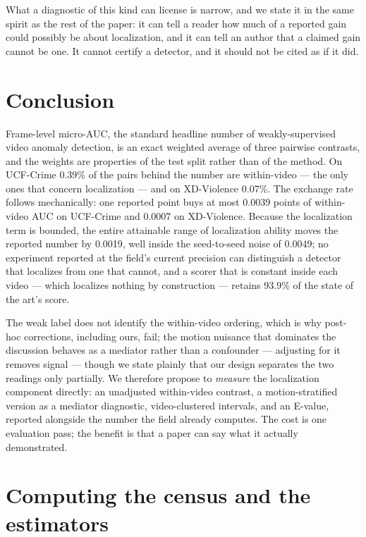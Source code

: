 \documentclass[number,preprint,12pt]{elsarticle}
\begin{document}
What a diagnostic of this kind can license is narrow, and we state it in the same
spirit as the rest of the paper: it can tell a reader how much of a reported gain
could possibly be about localization, and it can tell an author that a claimed
gain cannot be one. It cannot certify a detector, and it should not be cited as
if it did.

\section{Conclusion}\label{sec:conclusion}

Frame-level micro-AUC, the standard headline number of weakly-supervised video
anomaly detection, is an exact weighted average of three pairwise contrasts, and
the weights are properties of the test split rather than of the method. On
UCF-Crime 0.39\% of the pairs behind the number are within-video --- the only ones
that concern localization --- and on XD-Violence 0.07\%. The exchange rate follows
mechanically: one reported point buys at most 0.0039 points of within-video AUC on
UCF-Crime and 0.0007 on XD-Violence. Because the localization term is bounded,
the entire attainable range of localization ability moves the reported number by
0.0019, well inside the seed-to-seed noise of 0.0049; no experiment reported at
the field's current precision can distinguish a detector that localizes from one
that cannot, and a scorer that is constant inside each video --- which localizes
nothing by construction --- retains 93.9\% of the state of the art's score.

The weak label does not identify the within-video ordering, which is why
post-hoc corrections, including ours, fail; the motion nuisance that dominates
the discussion behaves as a mediator rather than a confounder --- adjusting for
it removes signal --- though we state plainly that our design separates the two
readings only partially. We therefore propose to \emph{measure} the localization component
directly: an unadjusted within-video contrast, a motion-stratified version as a
mediator diagnostic, video-clustered intervals, and an E-value, reported
alongside the number the field already computes. The cost is one
evaluation pass; the benefit is that a paper can say what it actually
demonstrated.

\appendix
\section{Computing the census and the estimators}\label{sec:appA}
\end{document}
